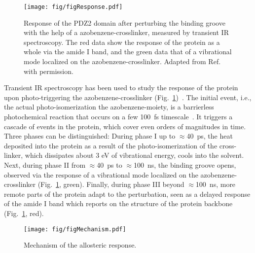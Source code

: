 \documentclass[journal=jacsat,manuscript=article]{achemso}
\begin{document}
\begin{figure}[h]
\centering
\texttt{[image: fig/figResponse.pdf]}
\caption{Response of the PDZ2 domain after perturbing the binding
  groove with the help of a azobenzene-crosslinker, measured by
  transient IR spectroscopy. The red data show the response of the
  protein as a whole via the amide I band, and the green data that of
  a vibrational mode localized on the azobenzene-crosslinker. Adapted
  from Ref.~\cite{buchli13} with permission.}
\label{figResponse}
\end{figure}

Transient IR spectroscopy has been used to study the response of the
protein upon photo-triggering the azobenzene-crosslinker
(Fig.~\ref{figResponse})~\cite{buchli13}. The initial event, i.e., the
actual photo-isomerization the azobenzene-moiety, is a barrierless
photochemical reaction that occurs on a few 100~fs
timescale~\cite{naeg97}. It triggers a cascade of events in the
protein, which cover even orders of magnitudes in time. Three phases
can be distinguished: During phase I up to $\approx$40~ps, the heat
deposited into the protein as a result of the photo-isomerization of
the cross-linker, which dissipates about 3 eV of vibrational energy,
cools into the solvent. Next, during phase II from $\approx$40~ps to
$\approx$100~ns, the binding groove opens, observed via the response
of a vibrational mode localized on the azobenzene-crosslinker
(Fig.~\ref{figResponse}, green). Finally, during phase III beyond
$\approx$100~ns, more remote parts of the protein adapt to the
perturbation, seen as a delayed response of the amide I band which
reports on the structure of the protein backbone
(Fig.~\ref{figResponse}, red).

\begin{figure}[h]
\centering
\texttt{[image: fig/figMechanism.pdf]}
\caption{Mechanism of the allosteric response.}
\label{figMech}
\end{figure}
\end{document}
